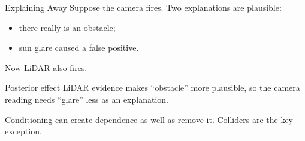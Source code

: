 \documentclass[aspectratio=169,10pt]{beamer}
\begin{document}
\begin{frame}[shrink=10]{Explaining Away}
  Suppose the camera fires. Two explanations are plausible:
  \begin{itemize}
    \item there really is an obstacle;
    \item sun glare caused a false positive.
  \end{itemize}

  Now LiDAR also fires.

  \begin{block}{Posterior effect}
    LiDAR evidence makes ``obstacle'' more plausible, so the camera reading needs ``glare'' less as an explanation.
  \end{block}

  \begin{center}
  \end{center}

  \begin{keyidea}
    Conditioning can create dependence as well as remove it. Colliders are the key exception.
  \end{keyidea}
\end{frame}
\end{document}
